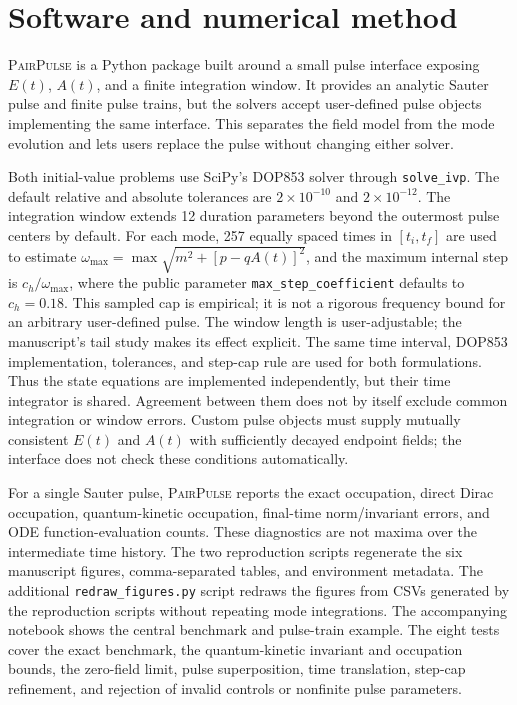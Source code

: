 \documentclass[a4paper,fleqn]{cas-dc}
\newcommand{\PairPulse}{\textsc{PairPulse}}
\begin{document}
\section{Software and numerical method}
\label{sec:software}

\PairPulse{} is a Python package built around a small pulse interface exposing $E(t)$, $A(t)$, and a finite integration window. It provides an analytic Sauter pulse and finite pulse trains, but the solvers accept user-defined pulse objects implementing the same interface. This separates the field model from the mode evolution and lets users replace the pulse without changing either solver.

Both initial-value problems use SciPy's DOP853 solver through \texttt{solve\_ivp}. The default relative and absolute tolerances are $2\times10^{-10}$ and $2\times10^{-12}$. The integration window extends 12 duration parameters beyond the outermost pulse centers by default. For each mode, 257 equally spaced times in $[t_i,t_f]$ are used to estimate $\omega_{\max}=\max\sqrt{m^2+[p-qA(t)]^2}$, and the maximum internal step is $c_h/\omega_{\max}$, where the public parameter \texttt{max\_step\_coefficient} defaults to $c_h=0.18$. This sampled cap is empirical; it is not a rigorous frequency bound for an arbitrary user-defined pulse. The window length is user-adjustable; the manuscript's tail study makes its effect explicit. The same time interval, DOP853 implementation, tolerances, and step-cap rule are used for both formulations. Thus the state equations are implemented independently, but their time integrator is shared. Agreement between them does not by itself exclude common integration or window errors. Custom pulse objects must supply mutually consistent $E(t)$ and $A(t)$ with sufficiently decayed endpoint fields; the interface does not check these conditions automatically.

For a single Sauter pulse, \PairPulse{} reports the exact occupation, direct Dirac occupation, quantum-kinetic occupation, final-time norm/invariant errors, and ODE function-evaluation counts. These diagnostics are not maxima over the intermediate time history. The two reproduction scripts regenerate the six manuscript figures, comma-separated tables, and environment metadata. The additional \texttt{redraw\_figures.py} script redraws the figures from CSVs generated by the reproduction scripts without repeating mode integrations. The accompanying notebook shows the central benchmark and pulse-train example. The eight tests cover the exact benchmark, the quantum-kinetic invariant and occupation bounds, the zero-field limit, pulse superposition, time translation, step-cap refinement, and rejection of invalid controls or nonfinite pulse parameters.
\end{document}
